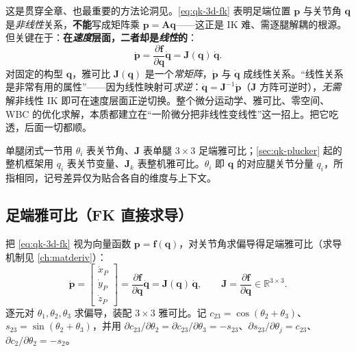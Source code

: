 \begin{insight}\label{ins:qk-diff-linearize}
这是贯穿全章、也最重要的方法论洞见。\cref{eq:qk-3d-fk} 表明足端位置 $\boldsymbol{p}$ 与关节角 $\boldsymbol{q}$ 是\emph{非线性}关系，\textbf{不能}写成矩阵乘 $\boldsymbol{p}=\mathbf{A}\boldsymbol{q}$——这正是 IK 难、需逐腿解耦的根源。但关键在于：\textbf{在\emph{速度}层面，二者却是\emph{线性}的}\cite{unitree2023quadruped}：
\[
  \dot{\boldsymbol{p}}=\frac{\partial\boldsymbol{f}}{\partial\boldsymbol{q}}\dot{\boldsymbol{q}}=\mathbf{J}(\boldsymbol{q})\,\dot{\boldsymbol{q}}.
\]
对固定的构型 $\boldsymbol{q}$，雅可比 $\mathbf{J}(\boldsymbol{q})$ 是一个\emph{常矩阵}，$\dot{\boldsymbol{p}}$ 与 $\dot{\boldsymbol{q}}$ 成线性关系。“线性关系是非常有用的属性”——因为线性映射可\emph{求逆}：$\dot{\boldsymbol{q}}=\mathbf{J}^{-1}\dot{\boldsymbol{p}}$（$\mathbf{J}$ 方阵可逆时），\emph{无需}解非线性 IK 即可在速度层面正逆切换。整个微分运动学、雅可比、零空间、WBC 的优化求解，本质都建立在“一阶微分把非线性变线性”这一招上。把它吃透，后面一切都顺。
\end{insight}

\begin{note}\label{note:qk-theta-q}
单腿闭式一节用 $\theta_i$ 表关节角、$\mathbf{J}$ 表单腿 $3\times3$ 足端雅可比；\cref{sec:qk-plucker} 起的整机框架用 $q_i$ 表关节变量、$\mathbf{J}_k$ 表整机雅可比。$\theta_i$ 即 $\boldsymbol{q}$ 的对应腿关节分量 $q_i$，所指相同，记号差异仅为贴合各自的维度与上下文。
\end{note}

\subsection{足端雅可比（FK 直接求导）}
\label{subsec:qk-jacobian-def}

把 \cref{eq:qk-3d-fk} 视为向量函数 $\boldsymbol{p}=\boldsymbol{f}(\boldsymbol{q})$，对关节角求偏导得足端雅可比\cite{unitree2023quadruped}（求导机制见 \cref{ch:matderiv}）：
\begin{equation}
  \dot{\boldsymbol{p}}=\begin{bmatrix}\dot x_P\\\dot y_P\\\dot z_P\end{bmatrix}
  =\frac{\partial\boldsymbol{f}}{\partial\boldsymbol{q}}\dot{\boldsymbol{q}}=\mathbf{J}(\boldsymbol{q})\,\dot{\boldsymbol{q}},
  \qquad
  \mathbf{J}=\frac{\partial\boldsymbol{f}}{\partial\boldsymbol{q}}\in\mathbb{R}^{3\times3}.
  \label{eq:qk-jacobian-def}
\end{equation}
逐元对 $\theta_1,\theta_2,\theta_3$ 求偏导，装配 $3\times3$ 雅可比。记 $c_{23}{=}\cos(\theta_2{+}\theta_3)$、$s_{23}{=}\sin(\theta_2{+}\theta_3)$，并用 $\partial c_{23}/\partial\theta_2=\partial c_{23}/\partial\theta_3=-s_{23}$、$\partial s_{23}/\partial\theta_j=c_{23}$、$\partial c_2/\partial\theta_2=-s_2$。

